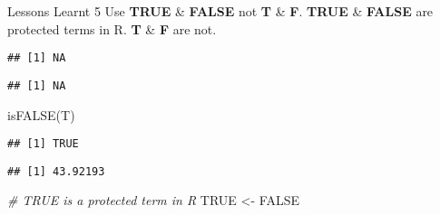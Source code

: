 \documentclass[
  ignorenonframetext,
]{beamer}
\newenvironment{Shaded}{\begin{snugshade}}{\end{snugshade}}
\newcommand{\AttributeTok}[1]{\textcolor[rgb]{0.77,0.63,0.00}{#1}}
\newcommand{\CommentTok}[1]{\textcolor[rgb]{0.56,0.35,0.01}{\textit{#1}}}
\newcommand{\ConstantTok}[1]{\textcolor[rgb]{0.00,0.00,0.00}{#1}}
\newcommand{\FunctionTok}[1]{\textcolor[rgb]{0.00,0.00,0.00}{#1}}
\newcommand{\NormalTok}[1]{#1}
\newcommand{\OtherTok}[1]{\textcolor[rgb]{0.56,0.35,0.01}{#1}}
\newcommand{\SpecialCharTok}[1]{\textcolor[rgb]{0.00,0.00,0.00}{#1}}
\begin{document}
\begin{frame}[fragile]{Lessons Learnt 5}
\protect\hypertarget{lessons-learnt-5}{}
Use \textbf{TRUE} \& \textbf{FALSE} not \textbf{T} \& \textbf{F}.
\textbf{TRUE} \& \textbf{FALSE} are protected terms in R. \textbf{T} \&
\textbf{F} are not.

\begin{Shaded}
\end{Shaded}

\begin{verbatim}
## [1] NA
\end{verbatim}

\begin{Shaded}
\end{Shaded}

\begin{verbatim}
## [1] NA
\end{verbatim}

\begin{Shaded}
\begin{Highlighting}[]
\FunctionTok{isFALSE}\NormalTok{(T)}
\end{Highlighting}
\end{Shaded}

\begin{verbatim}
## [1] TRUE
\end{verbatim}

\begin{Shaded}
\end{Shaded}

\begin{verbatim}
## [1] 43.92193
\end{verbatim}

\begin{Shaded}
\begin{Highlighting}[]
\CommentTok{\# TRUE is a protected term in R}
\ConstantTok{TRUE} \OtherTok{\textless{}{-}} \ConstantTok{FALSE}
\end{Highlighting}
\end{Shaded}
\end{frame}
\end{document}
